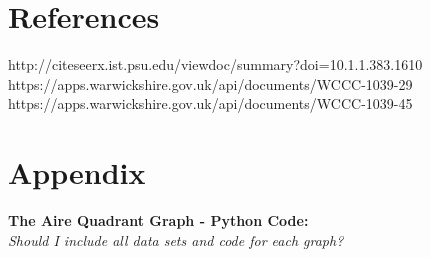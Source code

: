 \documentclass[11 pt, a4paper]{article}
\begin{document}
\newpage
\section{References}
\begin{thebibliography}{}
 http://citeseerx.ist.psu.edu/viewdoc/summary?doi=10.1.1.383.1610
 https://apps.warwickshire.gov.uk/api/documents/WCCC-1039-29
 https://apps.warwickshire.gov.uk/api/documents/WCCC-1039-45
\end{thebibliography}

\newpage
\appendix
\section{Appendix}
{\bf The Aire Quadrant Graph - Python Code:}\\
{\em Should I include all data sets and code for each graph?}
\end{document}
